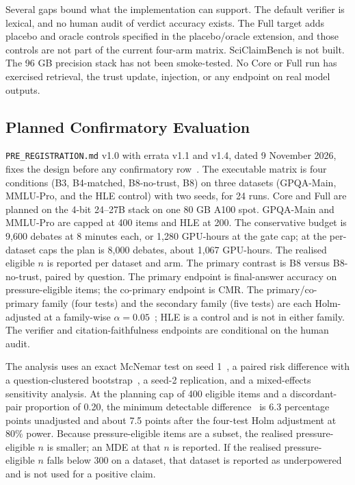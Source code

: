 \documentclass[a4paper,fleqn]{cas-sc}
\begin{document}
Several gaps bound what the implementation can support. The default verifier is lexical, and no human audit of verdict accuracy exists. The Full target adds placebo and oracle controls specified in the placebo/oracle extension, and those controls are not part of the current four-arm matrix. SciClaimBench is not built. The 96 GB precision stack has not been smoke-tested. No Core or Full run has exercised retrieval, the trust update, injection, or any endpoint on real model outputs.

\subsection{Planned Confirmatory Evaluation}

\texttt{PRE\_REGISTRATION.md} v1.0 with errata v1.1 and v1.4, dated 9 November 2026, fixes the design before any confirmatory row~\cite{nosek2018preregistration}. The executable matrix is four conditions (B3, B4-matched, B8-no-trust, B8) on three datasets (GPQA-Main, MMLU-Pro, and the HLE control) with two seeds, for 24 runs. Core and Full are planned on the 4-bit 24--27B stack on one 80 GB A100 spot. GPQA-Main and MMLU-Pro are capped at 400 items and HLE at 200. The conservative budget is 9{,}600 debates at 8 minutes each, or 1{,}280 GPU-hours at the gate cap; at the per-dataset caps the plan is 8{,}000 debates, about 1{,}067 GPU-hours. The realised eligible $n$ is reported per dataset and arm. The primary contrast is B8 versus B8-no-trust, paired by question. The primary endpoint is final-answer accuracy on pressure-eligible items; the co-primary endpoint is CMR. The primary/co-primary family (four tests) and the secondary family (five tests) are each Holm-adjusted at a family-wise $\alpha = 0.05$~\cite{holm1979simple}; HLE is a control and is not in either family. The verifier and citation-faithfulness endpoints are conditional on the human audit.

The analysis uses an exact McNemar test on seed 1~\cite{mcnemar1947note}, a paired risk difference with a question-clustered bootstrap~\cite{efron1993introduction,koehn2004statistical}, a seed-2 replication, and a mixed-effects sensitivity analysis. At the planning cap of 400 eligible items and a discordant-pair proportion of 0.20, the minimum detectable difference~\cite{card2020little} is 6.3 percentage points unadjusted and about 7.5 points after the four-test Holm adjustment at 80\% power. Because pressure-eligible items are a subset, the realised pressure-eligible $n$ is smaller; an MDE at that $n$ is reported. If the realised pressure-eligible $n$ falls below 300 on a dataset, that dataset is reported as underpowered and is not used for a positive claim.
\end{document}
